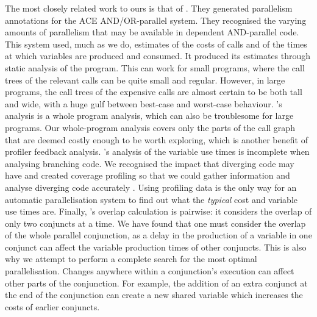 The most closely related work to ours is that of
\citet*{Pontelli97automaticcompile-time}.
They generated parallelism annotations for the ACE AND/OR-parallel system.
They recognised the varying amounts of parallelism that may be available in
dependent AND-parallel code.
This system used, much as we do,
estimates of the costs of calls
and of the times at which variables are produced and consumed.
It produced its estimates through static analysis of the program.
This can work for small programs,
where the call trees of the relevant calls can be quite small and regular.
However, in large programs, the call trees of the expensive calls
are almost certain to be both tall and wide,
with a huge gulf between best-case and worst-case behaviour.
\citeauthor{Pontelli97automaticcompile-time}'s analysis is a whole program
analysis,
which can also be troublesome for large programs.
Our whole-program analysis covers only the parts of the call graph that are
deemed costly enough to be worth exploring,
which is another benefit of profiler feedback analysis.
\citeauthor{Pontelli97automaticcompile-time}'s analysis of the variable use
times is incomplete when analysing branching code.
We recognised the impact that diverging code may have and created coverage
profiling so that we could gather information and analyse diverging code
accurately \citep{bone:2008:hons}.
Using profiling data is the only way
for an automatic parallelisation system to find out
what the \emph{typical} cost and variable use times are.
Finally, \citeauthor{Pontelli97automaticcompile-time}'s overlap calculation is
pairwise:
it considers the overlap of only two conjuncts at a time.
We have found that one must consider the overlap of the whole parallel
conjunction, as a delay in the production of a variable in one conjunct can
affect the variable production times of other conjuncts.
This is also why we attempt to perform a complete search for the most optimal
parallelisation.
Changes anywhere within a conjunction's execution can affect other parts of
the conjunction.
For example,
the addition of an extra conjunct at the end of the conjunction can create a
new shared variable which increases the costs of earlier conjuncts.


